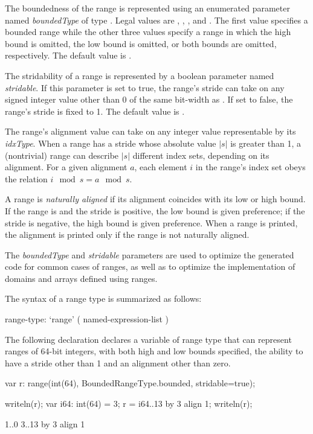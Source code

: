 The boundedness of the range is represented using an enumerated
parameter named \emph{boundedType} of type .
Legal values are , ,
, and .  The first value specifies
a bounded range while the other three values specify a range in which
the high bound is omitted, the low bound is omitted, or both bounds
are omitted, respectively.  The default value is .

The stridability of a range is represented by a boolean parameter
named \emph{stridable}.  If this parameter is set to true, the range's
stride can take on any signed integer value other than 0 of the same
bit-width as .  If set to false, the range's stride is
fixed to 1.  The default value is .

The range's alignment value can take on any integer value representable by
its \emph{idxType}.  When a range has a stride whose absolute value $|s|$ is
greater than 1, a (nontrivial) range can describe $|s|$ different index
sets, depending on its alignment.  For a given alignment $a$, each element $i$
in the range's index set obeys the relation $i \mod s = a \mod s$.  

A range is \emph{naturally aligned} if its alignment coincides with its low or
high bound.  If the range is  and the stride is positive, the low
bound is given preference; if the stride is negative, the high bound is given preference.
When a range is printed, the alignment is printed only if the range
is not naturally aligned.

\begin{rationale}
The \emph{boundedType} and \emph{stridable} parameters are used
to optimize the generated code for common cases of ranges, as well as
to optimize the implementation of domains and arrays defined using ranges.
\end{rationale}

The syntax of a range type is summarized as follows:
\begin{syntax}
range-type:
  `range' ( named-expression-list )
\end{syntax}

\begin{example}
The following declaration declares a variable 
of range type that can represent ranges of 64-bit integers, with both
high and low bounds specified, the ability to have a stride other
than 1 and an alignment other than zero.
\begin{chapelpre}
\end{chapelpre}
\begin{chapel}
var r: range(int(64), BoundedRangeType.bounded, stridable=true);
\end{chapel}
\begin{chapelpost}
writeln(r);
var i64: int(64) = 3;
r = i64..13 by 3 align 1;
writeln(r);
\end{chapelpost}
\begin{chapeloutput}
1..0
3..13 by 3 align 1
\end{chapeloutput}
\end{example}

